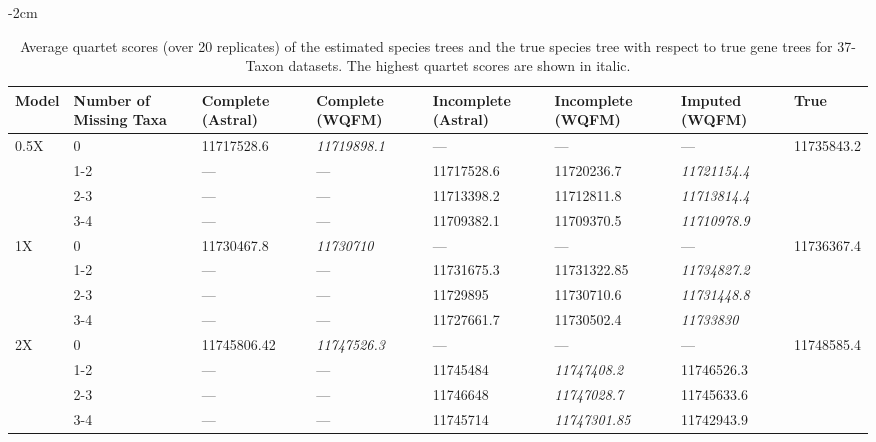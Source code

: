 
\begin{table}[H]
  \small
  \centering
    \addtolength{\leftskip} {-2cm} %
    \addtolength{\rightskip}{-2cm}
    \caption{Average quartet scores (over 20 replicates) of the estimated species trees and the true species tree with respect to true gene trees for 37-Taxon datasets. %
    The highest quartet scores are shown in italic.}
    \label{tab:qscore-37-true}
\begin{tabularx}{1.2\textwidth}{|X|X|X|X|X|X|X|X|}


\hline
    Model & Number of Missing Taxa  & Complete (Astral)  & Complete (WQFM) & Incomplete (Astral) & Incomplete (WQFM)  &	Imputed (WQFM) & True \\
    \hline\hline
    \multirow{4}{0.25\textwidth}{0.5X} 
    & 0   & 11717528.6	& \textit{11719898.1} & --- & --- & --- & \multirow{4}{0.25\textwidth}{11735843.2}  \\ \cline{2-7}
    & 1-2 & --- & --- &	11717528.6	 & 	11720236.7
    & \textit{11721154.4} &  \\ \cline{2-7}
    & 2-3 & --- & ---  &	11713398.2	& 11712811.8
    & \textit{11713814.4} & \\ \cline{2-7}
    & 3-4 & ---	& ---  &	11709382.1		
    & 11709370.5	& \textit{11710978.9} & \\ \cline{2-7}
    \hline
    
    \multirow{4}{0.25\textwidth}{1X} 
    & 0 & 11730467.8 & \textit{11730710} & --- & --- & --- & \multirow{4}{0.25\textwidth}{11736367.4}  \\ \cline{2-7}
    & 1-2 & --- & ---  &	11731675.3 & 11731322.85
    &	\textit{11734827.2} &  \\ \cline{2-7}
    & 2-3 & --- &	---	 &	11729895    & 11730710.6 
    & \textit{11731448.8} \\ \cline{2-7}
    & 3-4 & --- &	---  & 11727661.7	& 11730502.4  &	\textit{11733830} &   \\ \cline{2-7}
    \hline
    
    \multirow{4}{0.25\textwidth}{2X} 
    & 0 & 11745806.42	&	\textit{11747526.3} & --- & --- & --- & \multirow{4}{0.25\textwidth}{11748585.4}  \\ \cline{2-7}
    & 1-2 & --- &	---  &	11745484   &	\textit{11747408.2}  &	11746526.3 & \\ \cline{2-7}
    & 2-3 & --- &	---  &	11746648   &	\textit{11747028.7} &	11745633.6 &  \\ \cline{2-7}
    & 3-4 & --- &	---  &	11745714  &	   \textit{11747301.85}  & 11742943.9 &  \\ \cline{2-7}
    
    \hline
        
    
\end{tabularx}

\end{table}